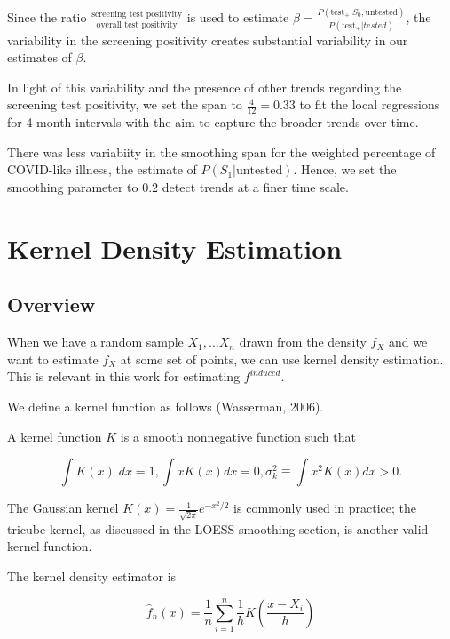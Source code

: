 \documentclass[12pt,twoside]{smiththesis}
\begin{document}
Since the ratio \(\frac{\text{screening test positivity}}{\text{overall test positivity}}\) is used to estimate \(\beta = \frac{P(\text{test}_+| S_0, \text{untested})}{P(\text{test}_+|tested)}\), the variability in the screening positivity creates substantial variability in our estimates of \(\beta\).

In light of this variability and the presence of other trends regarding the screening test positivity, we set the span to \(\frac{4}{12} = 0.33\) to fit the local regressions for 4-month intervals with the aim to capture the broader trends over time.

There was less variabiity in the smoothing span for the weighted percentage of COVID-like illness, the estimate of \(P(S_1|\text{untested})\). Hence, we set the smoothing parameter to \(0.2\) detect trends at a finer time scale.

\newpage

\hypertarget{kernel-density-estimation}{%
\section{Kernel Density Estimation}\label{kernel-density-estimation}}

\hypertarget{overview-2}{%
\subsection{Overview}\label{overview-2}}

When we have a random sample \(X_1,\dots X_n\) drawn from the density \(f_X\) and we want to estimate \(f_X\) at some set of points, we can use kernel density estimation. This is relevant in this work for estimating \(f^{induced}\).

We define a kernel function as follows (Wasserman, 2006).
\begin{tcolorbox}[title=Definition: Kernel Function]

A kernel function $K$ is a smooth nonnegative function such that 

$$\int K(x) \; dx = 1, \int x K(x) dx = 0, \sigma^2_k \equiv \int x^2 K(x) dx > 0.$$ 
\end{tcolorbox}
The Gaussian kernel \(K(x) = \frac{1}{\sqrt{2\pi}}e^{-x^2/2}\) is commonly used in practice; the tricube kernel, as discussed in the LOESS smoothing section, is another valid kernel function.

The kernel density estimator is

\[\hat f_n(x) = \frac 1n \sum_{i=1}^n \frac 1h K\left(\dfrac{x-X_i}{h} \right)\]
\end{document}
